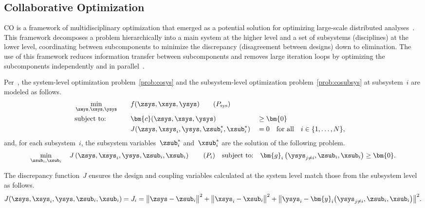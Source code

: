 \subsection{Collaborative Optimization}\label{subsec:collopt}

CO is a framework of multidisciplinary optimization that emerged as a potential solution for optimizing large-scale distributed analyses~\cite{braun1995}. This framework decomposes a problem hierarchically into a main system at the higher level and a set of subsystems (disciplines) at the lower level, coordinating between subcomponents to minimize the discrepancy (disagreement between designs) down to elimination. The use of this framework reduces information transfer between subcomponents and removes large iteration loops by optimizing the subcomponents independently and in parallel~\cite{martins2013, braun1995}.

Per~\cite{martins2013}, the system-level optimization problem~\eqref{prob:cosys} and the subsystem-level optimization problem~\eqref{prob:cosubsys} at subsystem~\(i\) are modeled as follows.
\begin{alignat}{3}
  &\min_{
    \zsys,
    \xsys,
    \ysys
  }\quad&&f(
    \zsys,
    \xsys,
    \ysys
  ) \tag{\(P_\text{sys}\)}\label{prob:cosys}\\
  &\text{subject to:}\quad&&\bm{c}(
    \zsys,
    \xsys,
    \ysys
  ) &&\geq \bm{0}\nonumber\\
  &  && J(
    \zsys,
    \xsys_i,
    \ysys,
    \zsub_i^*,
    \xsub_i^*
  ) &&= 0\quad \text{for all}\quad i\in\{1, \ldots, N\},\nonumber
\end{alignat}
and, for each subsystem~\(i\), the subsystem variables~\(\zsub_i^*\) and~\(\xsub_i^*\) are the solution of the following problem.
\begin{equation}
  \min_{
    \zsub_i,
    \xsub_i
  }\quad J\left(
    \zsys,
    \xsys_i,
    \ysys,
    \zsub_i,
    \xsub_i
  \right) \tag{\(P_i\)}\quad
  \text{subject to:}\quad\bm{g}_i\left(
    \ysys_{j\neq i},
    \zsub_i,
    \xsub_i
  \right)\geq\bm{0}.\label{prob:cosubsys}
\end{equation}

The discrepancy function~\(J\) ensures the design and coupling variables calculated at the system level match those from the subsystem level as follows.
\begin{equation}
  J(
    \zsys,
    \xsys_i,
    \ysys,
    \zsub_i,
    \xsub_i
  ) = J_i =
  \bigl\|\zsys-\zsub_i\bigr\|^2 +
  \bigl\|\xsys_i-\xsub_i\bigr\|^2 +
  \bigl\|\ysys_i-\bm{y}_i\bigl(
    \ysys_{j\neq i},
    \zsub_i,
    \xsub_i
  \bigr)\bigr\|^2.\label{eqn:discre}
\end{equation}

